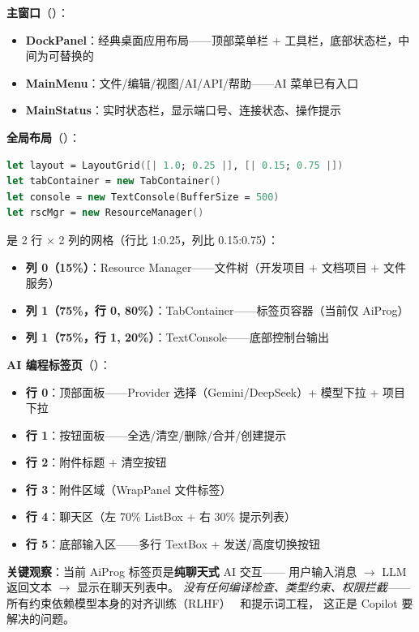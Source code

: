 \documentclass[10pt, openany]{book}
\begin{document}
\textbf{主窗口}（）：
\begin{itemize}
    \item \textbf{DockPanel}：经典桌面应用布局——顶部菜单栏 + 工具栏，底部状态栏，中间为可替换的 
    \item \textbf{MainMenu}：文件/编辑/视图/AI/API/帮助——AI 菜单已有入口
    \item \textbf{MainStatus}：实时状态栏，显示端口号、连接状态、操作提示
\end{itemize}

\textbf{全局布局}（）：
\begin{lstlisting}[language=FSharp]
let layout = LayoutGrid([| 1.0; 0.25 |], [| 0.15; 0.75 |])
let tabContainer = new TabContainer()
let console = new TextConsole(BufferSize = 500)
let rscMgr = new ResourceManager()
\end{lstlisting}

 是 2 行 \(\times\) 2 列的网格（行比 1:0.25，列比 0.15:0.75）：
\begin{itemize}
    \item \textbf{列 0（15\%）}：Resource Manager——文件树（开发项目 + 文档项目 + 文件服务）
    \item \textbf{列 1（75\%，行 0, 80\%）}：TabContainer——标签页容器（当前仅 AiProg）
    \item \textbf{列 1（75\%，行 1, 20\%）}：TextConsole——底部控制台输出
\end{itemize}

\textbf{AI 编程标签页}（）：
\begin{itemize}
    \item \textbf{行 0}：顶部面板——Provider 选择（Gemini/DeepSeek）+ 模型下拉 + 项目下拉
    \item \textbf{行 1}：按钮面板——全选/清空/删除/合并/创建提示
    \item \textbf{行 2}：附件标题 + 清空按钮
    \item \textbf{行 3}：附件区域（WrapPanel 文件标签）
    \item \textbf{行 4}：聊天区（左 70\% ListBox + 右 30\% 提示列表）
    \item \textbf{行 5}：底部输入区——多行 TextBox + 发送/高度切换按钮
\end{itemize}

\begin{framed}
\textbf{关键观察}：当前 AiProg 标签页是\textbf{纯聊天式} AI 交互——
用户输入消息 \(\rightarrow\) LLM 返回文本 \(\rightarrow\) 显示在聊天列表中。
\emph{没有任何编译检查、类型约束、权限拦截}——
所有约束依赖模型本身的对齐训练（RLHF）~\cite{Ouyang2022InstructGPT} 和提示词工程，
这正是 Copilot 要解决的问题。
\end{framed}
\end{document}
